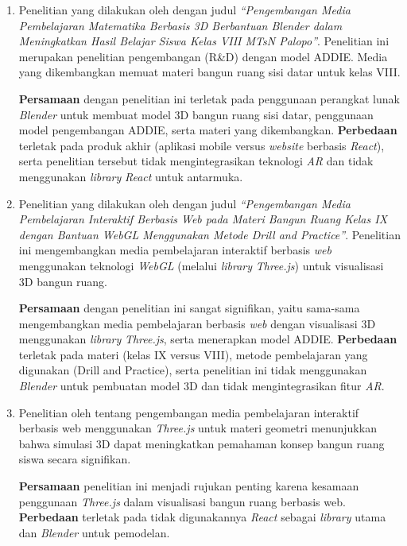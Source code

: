 \begin{enumerate}
    \item Penelitian yang dilakukan oleh \citet{arrasyid2024} dengan judul \textit{“Pengembangan Media Pembelajaran Matematika Berbasis 3D Berbantuan Blender dalam Meningkatkan Hasil Belajar Siswa Kelas VIII MTsN Palopo”}. Penelitian ini merupakan penelitian pengembangan (R\&D) dengan model ADDIE. Media yang dikembangkan memuat materi bangun ruang sisi datar untuk kelas VIII. 

    \textbf{Persamaan} dengan penelitian ini terletak pada penggunaan perangkat lunak \textit{Blender} untuk membuat model 3D bangun ruang sisi datar, penggunaan model pengembangan ADDIE, serta materi yang dikembangkan. \textbf{Perbedaan} terletak pada produk akhir (aplikasi mobile versus \textit{website} berbasis \textit{React}), serta penelitian tersebut tidak mengintegrasikan teknologi \textit{AR} dan tidak menggunakan \textit{library} \textit{React} untuk antarmuka.

    \item Penelitian yang dilakukan oleh \citet{lestari2026} dengan judul \textit{“Pengembangan Media Pembelajaran Interaktif Berbasis Web pada Materi Bangun Ruang Kelas IX dengan Bantuan \textit{WebGL} Menggunakan Metode Drill and Practice”}. Penelitian ini mengembangkan media pembelajaran interaktif berbasis \textit{web} menggunakan teknologi \textit{WebGL} (melalui \textit{library} \textit{Three.js}) untuk visualisasi 3D bangun ruang.

    \textbf{Persamaan} dengan penelitian ini sangat signifikan, yaitu sama-sama mengembangkan media pembelajaran berbasis \textit{web} dengan visualisasi 3D menggunakan \textit{library} \textit{Three.js}, serta menerapkan model ADDIE. \textbf{Perbedaan} terletak pada materi (kelas IX versus VIII), metode pembelajaran yang digunakan (Drill and Practice), serta penelitian ini tidak menggunakan \textit{Blender} untuk pembuatan model 3D dan tidak mengintegrasikan fitur \textit{AR}.

    \item Penelitian oleh \citet{hakiki2022} tentang pengembangan media pembelajaran interaktif berbasis web menggunakan \textit{Three.js} untuk materi geometri menunjukkan bahwa simulasi 3D dapat meningkatkan pemahaman konsep bangun ruang siswa secara signifikan. 
    
    \textbf{Persamaan} penelitian ini menjadi rujukan penting karena kesamaan penggunaan \textit{Three.js} dalam visualisasi bangun ruang berbasis web. \textbf{Perbedaan} terletak pada tidak digunakannya \textit{React} sebagai \textit{library} utama dan \textit{Blender} untuk pemodelan.


\end{enumerate}
